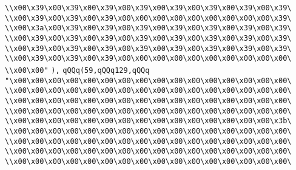 \verb|\\x00\x39\x00\x39\x00\x39\x00\x39\x00\x39\x00\x39\x00\x39\x00\x39\|\newline
\verb|\\x00\x39\x00\x39\x00\x39\x00\x00\x00\x00\x00\x00\x00\x00\x00\x39\|\newline
\verb|\\x00\x3a\x00\x39\x00\x39\x00\x39\x00\x39\x00\x39\x00\x39\x00\x39\|\newline
\verb|\\x00\x39\x00\x39\x00\x39\x00\x39\x00\x39\x00\x39\x00\x39\x00\x39\|\newline
\verb|\\x00\x39\x00\x39\x00\x39\x00\x39\x00\x39\x00\x39\x00\x39\x00\x39\|\newline
\verb|\\x00\x39\x00\x39\x00\x39\x00\x00\x00\x00\x00\x00\x00\x00\x00\x00\|\newline
\verb|\\x00\x00"|\newline
\verb|),|\newline
\verb|qQQq(59,qQQq129,qQQq|\newline
\verb|"\x00\x00\x00\x00\x00\x00\x00\x00\x00\x00\x00\x00\x00\x00\x00\x00\|\newline
\verb|\\x00\x00\x00\x00\x00\x00\x00\x00\x00\x00\x00\x00\x00\x00\x00\x00\|\newline
\verb|\\x00\x00\x00\x00\x00\x00\x00\x00\x00\x00\x00\x00\x00\x00\x00\x00\|\newline
\verb|\\x00\x00\x00\x00\x00\x00\x00\x00\x00\x00\x00\x00\x00\x00\x00\x00\|\newline
\verb|\\x00\x00\x00\x00\x00\x00\x00\x00\x00\x00\x00\x00\x00\x00\x00\x3b\|\newline
\verb|\\x00\x00\x00\x00\x00\x00\x00\x00\x00\x00\x00\x00\x00\x00\x00\x00\|\newline
\verb|\\x00\x00\x00\x00\x00\x00\x00\x00\x00\x00\x00\x00\x00\x00\x00\x00\|\newline
\verb|\\x00\x00\x00\x00\x00\x00\x00\x00\x00\x00\x00\x00\x00\x00\x00\x00\|\newline
\verb|\\x00\x00\x00\x00\x00\x00\x00\x00\x00\x00\x00\x00\x00\x00\x00\x00\|\newline
